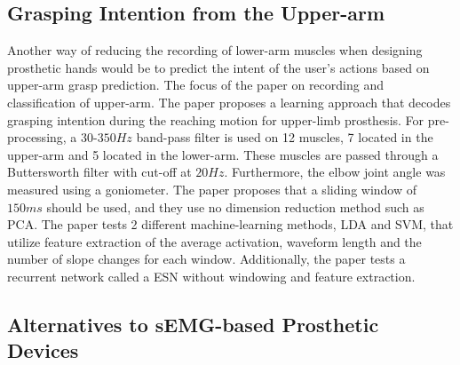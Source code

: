 \documentclass[../main.tex]{subfiles}
\begin{document}
\subsection{Grasping Intention from the Upper-arm}

Another way of reducing the recording of lower-arm muscles when designing prosthetic hands would be to predict the intent of the user's actions based on upper-arm grasp prediction.
The focus of the paper \cite{Batzianoulis2018} on recording and classification of upper-arm.
The paper proposes a learning approach that decodes grasping intention during the reaching motion for upper-limb prosthesis.
For pre-processing, a $30$-$350Hz$ band-pass filter is used on 12 muscles, 7 located in the upper-arm and 5 located in the lower-arm.
These muscles are passed through a Buttersworth filter with cut-off at $20Hz$.
Furthermore, the elbow joint angle was measured using a \gls{goniometer}.
The paper proposes that a sliding window of $150ms$ should be used, and they use no dimension reduction method such as \gls{PCA}.
The paper tests 2 different machine-learning methods, \gls{LDA} and \gls{SVM}, that utilize feature extraction of the average activation, waveform length and the number of slope changes for each window.
Additionally, the paper tests a recurrent network called a \gls{ESN} without windowing and feature extraction.

\subsection{Alternatives to sEMG-based Prosthetic Devices}
\end{document}

